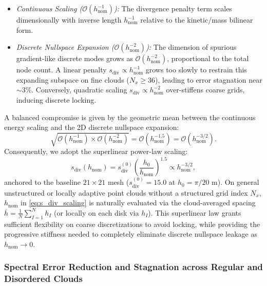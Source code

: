 \documentclass[preprint,12pt]{elsarticle}
\begin{document}
\begin{enumerate}
          \begin{itemize}
              \item \emph{Continuous Scaling ($\mathcal{O}(h_{\mathrm{nom}}^{-1})$):} The divergence penalty term scales dimensionally with inverse length $h_{\mathrm{nom}}^{-1}$ relative to the kinetic/mass bilinear form.
              \item \emph{Discrete Nullspace Expansion ($\mathcal{O}(h_{\mathrm{nom}}^{-2})$):} The dimension of spurious gradient-like discrete modes grows as $\mathcal{O}(h_{\mathrm{nom}}^{-2})$, proportional to the total node count. A linear penalty $s_{\mathrm{div}} \propto h_{\mathrm{nom}}^{-1}$ grows too slowly to restrain this expanding subspace on fine clouds ($N_x \ge 36$), leading to error stagnation near $\sim 3\%$. Conversely, quadratic scaling $s_{\mathrm{div}} \propto h_{\mathrm{nom}}^{-2}$ over-stiffens coarse grids, inducing discrete locking.
          \end{itemize}
          A balanced compromise is given by the geometric mean between the continuous energy scaling and the 2D discrete nullspace expansion:
          \begin{equation}
              \sqrt{\mathcal{O}(h_{\mathrm{nom}}^{-1}) \times \mathcal{O}(h_{\mathrm{nom}}^{-2})} = \mathcal{O}(h_{\mathrm{nom}}^{-1.5}) = \mathcal{O}(h_{\mathrm{nom}}^{-3/2}).
          \end{equation}
          Consequently, we adopt the superlinear power-law scaling:
          \begin{equation}
              s_{\mathrm{div}}(h_{\mathrm{nom}}) = s_{\mathrm{div}}^{(0)} \left( \frac{h_0}{h_{\mathrm{nom}}} \right)^{1.5} \propto h_{\mathrm{nom}}^{-3/2},
              \label{eq:s_div_scaling}
          \end{equation}
          anchored to the baseline $21\times 21$ mesh ($s_{\mathrm{div}}^{(0)} = 15.0$ at $h_0 = \pi/20\text{ m}$). On general unstructured or locally adaptive point clouds without a structured grid index $N_x$, $h_{\mathrm{nom}}$ in \eqref{eq:s_div_scaling} is naturally evaluated via the cloud-averaged spacing $\overline{h} = \frac{1}{N}\sum_{I=1}^N h_I$ (or locally on each disk via $h_I$). This superlinear law grants sufficient flexibility on coarse discretizations to avoid locking, while providing the progressive stiffness needed to completely eliminate discrete nullspace leakage as $h_{\mathrm{nom}} \to 0$.
\end{enumerate}

\subsubsection{Spectral Error Reduction and Stagnation across Regular and Disordered Clouds}
\label{subsubsec:cavity_jitter_error}
\end{document}
